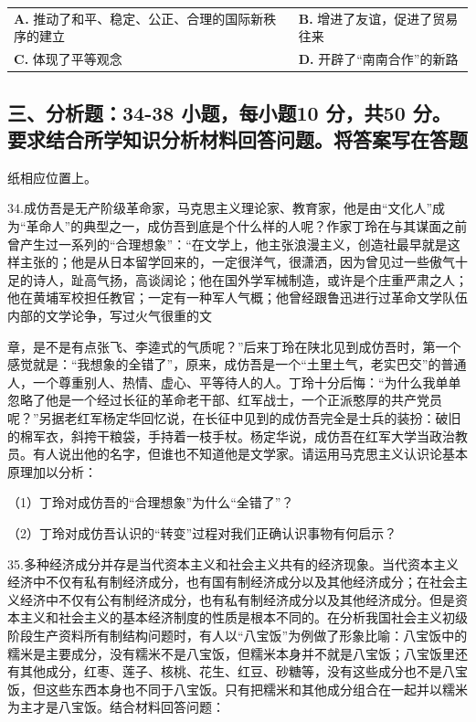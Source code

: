 \documentclass[UTF8,11pt]{ctexart}
\begin{document}
\begin{center}\begin{tabular}{>{\raggedright\arraybackslash}p{\dimexpr(\linewidth-4\tabcolsep)/2\relax}>{\raggedright\arraybackslash}p{\dimexpr(\linewidth-4\tabcolsep)/2\relax}}
\textbf{A.} 推动了和平、稳定、公正、合理的国际新秩序的建立 & \textbf{B.} 增进了友谊，促进了贸易往来\\[.35em]
\textbf{C.} 体现了平等观念 & \textbf{D.} 开辟了“南南合作”的新路\\[.35em]\end{tabular}\end{center}

\subsection*{三、分析题：34-38 小题，每小题10 分，共50 分。要求结合所学知识分析材料回答问题。将答案写在答题}

纸相应位置上。


34.成仿吾是无产阶级革命家，马克思主义理论家、教育家，他是由“文化人”成为“革命人”的典型之一，成仿吾到底是个什么样的人呢？作家丁玲在与其谋面之前曾产生过一系列的“合理想象”：“在文学上，他主张浪漫主义，创造社最早就是这样主张的；他是从日本留学回来的，一定很洋气，很潇洒，因为曾见过一些傲气十足的诗人，趾高气扬，高谈阔论；他在国外学军械制造，或许是个庄重严肃之人；他在黄埔军校担任教官；一定有一种军人气概；他曾经跟鲁迅进行过革命文学队伍内部的文学论争，写过火气很重的文


章，是不是有点张飞、李逵式的气质呢？”后来丁玲在陕北见到成仿吾时，第一个感觉就是：“我想象的全错了”，原来，成仿吾是一个“土里土气，老实巴交”的普通人，一个尊重别人、热情、虚心、平等待人的人。丁玲十分后悔：“为什么我单单忽略了他是一个经过长征的革命老干部、红军战士，一个正派憨厚的共产党员呢？”另据老红军杨定华回忆说，在长征中见到的成仿吾完全是士兵的装扮：破旧的棉军衣，斜挎干粮袋，手持着一枝手杖。杨定华说，成仿吾在红军大学当政治教员。有人说出他的名字，但谁也不知道他是文学家。请运用马克思主义认识论基本原理加以分析：


（1）丁玲对成仿吾的“合理想象”为什么“全错了”？


（2）丁玲对成仿吾认识的“转变”过程对我们正确认识事物有何启示？


35.多种经济成分并存是当代资本主义和社会主义共有的经济现象。当代资本主义经济中不仅有私有制经济成分，也有国有制经济成分以及其他经济成分；在社会主义经济中不仅有公有制经济成分，也有私有制经济成分以及其他经济成分。但是资本主义和社会主义的基本经济制度的性质是根本不同的。在分析我国社会主义初级阶段生产资料所有制结构问题时，有人以“八宝饭”为例做了形象比喻：八宝饭中的糯米是主要成分，没有糯米不是八宝饭，但糯米本身并不就是八宝饭；八宝饭里还有其他成分，红枣、莲子、核桃、花生、红豆、砂糖等，没有这些成分也不是八宝饭，但这些东西本身也不同于八宝饭。只有把糯米和其他成分组合在一起并以糯米为主才是八宝饭。结合材料回答问题：
\end{document}
